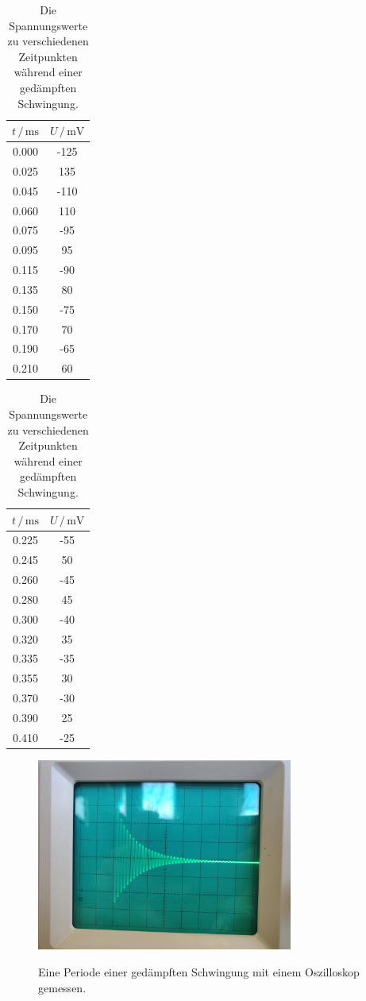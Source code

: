 \begin{table}
\centering
\caption{Die Spannungswerte zu verschiedenen Zeitpunkten während einer gedämpften Schwingung.}
\begin{tabular}[t]{cc}
    \toprule
    $t \, / \, \si{\milli\s}$ & $U \,/\, \si{\milli\V}$ \\
    \midrule
    0.000&-125\\
    0.025&135\\
    0.045&-110\\    
    0.060&110\\
    0.075&-95\\
    0.095&95\\
    0.115&-90\\
    0.135&80\\
    0.150&-75\\
    0.170&70\\
    0.190&-65\\
    0.210&60\\
\end{tabular}
\begin{tabular}[t]{cc}
    \toprule
    $t \, / \, \si{\milli\s}$ & $U \,/\, \si{\milli\V}$ \\
    \midrule
    0.225&-55\\
    0.245&50\\
    0.260&-45\\
    0.280&45\\
    0.300&-40\\
    0.320&35\\
    0.335&-35\\
    0.355&30\\
    0.370&-30\\
    0.390&25\\
    0.410&-25\\
    \bottomrule
\end{tabular}
\label{tab:gedaempft}
\end{table}

\begin{figure}
\centering
\caption{Eine Periode einer gedämpften Schwingung mit einem Oszilloskop gemessen.}
\includegraphics[width=0.75\textwidth]{content/data/schwingung_gedaempft.jpeg}
\label{fig:schwingung}
\end{figure}


